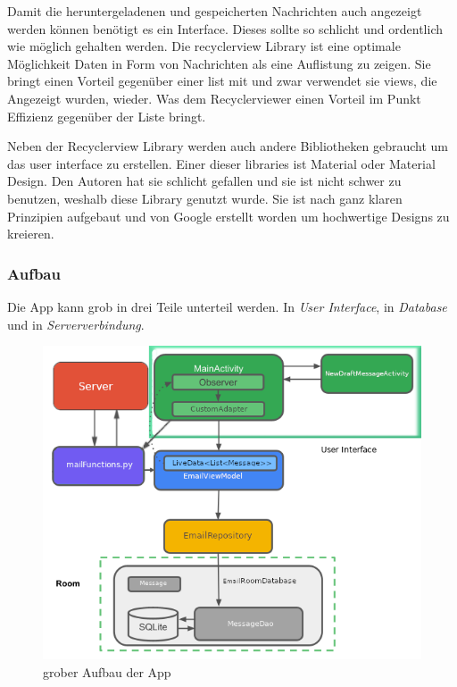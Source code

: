 \documentclass[a4paper,11pt]{article}
\begin{document}
\nohyphenation

Damit die heruntergeladenen und gespeicherten Nachrichten auch angezeigt werden können benötigt es ein Interface. Dieses sollte so schlicht und ordentlich wie möglich gehalten werden. 
Die \gls{recyclerview} Library ist eine optimale Möglichkeit Daten in Form von Nachrichten als eine Auflistung zu zeigen. Sie bringt einen Vorteil gegenüber einer \gls{list} mit und zwar
verwendet sie \glspl{view}, die Angezeigt wurden, wieder. Was dem Recyclerviewer einen Vorteil im Punkt Effizienz gegenüber der Liste bringt. \cite{recyclerViewRecycle}

Neben der Recyclerview Library werden auch andere Bibliotheken gebraucht um das \gls{user interface} zu erstellen. Einer dieser libraries ist Material oder Material Design. 
Den Autoren hat sie schlicht gefallen und sie ist nicht schwer zu benutzen, weshalb diese Library genutzt wurde. Sie ist nach ganz klaren Prinzipien aufgebaut 
und von Google erstellt worden um hochwertige Designs zu kreieren. \cite{materialDesigne}

\endgroup

\subsubsection{Aufbau}

Die App kann grob in drei Teile unterteil werden. In \textit{User Interface}, in \textit{Database} und in \textit{Serververbindung}. 

\begingroup
\setlength{\intextsep}{7pt}
\setlength{\columnsep}{15pt}

\begin{figure}
\centering
    \includegraphics[scale=.52]{media/AppStructureFull.png}
\caption{grober Aufbau der App}
\end{figure}
\end{document}
